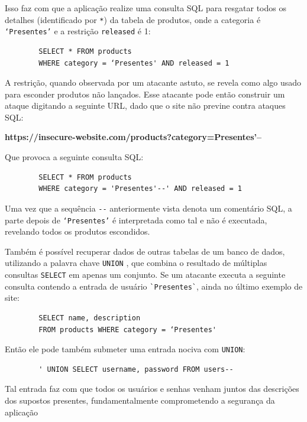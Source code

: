 \begin{alineas}
    Isso faz com que a aplicação realize uma consulta SQL para resgatar todos os detalhes (identificado por \verb+*+) da tabela de produtos, onde a categoria é \verb+‘Presentes’+ e a restrição \verb+released+ é 1:
    
    \begin{verbatim}
        SELECT * FROM products
        WHERE category = ‘Presentes' AND released = 1 
    \end{verbatim}
    
    A restrição, quando observada por um atacante astuto, se revela como algo usado para esconder produtos não lançados. Esse atacante pode então construir um ataque digitando a seguinte URL, dado que o site não previne contra ataques SQL:
        
    \textbf{https://insecure-website.com/products?category=Presentes’--}
    
    Que provoca a seguinte consulta SQL:
    
    \begin{verbatim}
        SELECT * FROM products 
        WHERE category = 'Presentes'--' AND released = 1 
    \end{verbatim}
    
     Uma vez que a sequência \verb+--+ anteriormente vista denota um comentário SQL, a parte depois de 
    \verb+‘Presentes’+ é interpretada como tal e não é executada, revelando todos os produtos escondidos.

    \item
    Também é possível recuperar dados de outras tabelas de um banco de dados, utilizando a palavra chave \verb+UNION+ \cite{mysql_union}, que combina o resultado de múltiplas consultas \verb+SELECT+ em apenas um conjunto. Se um atacante executa a seguinte consulta contendo a entrada de usuário \verb+`Presentes`+, ainda no último exemplo de site:
    
    \begin{verbatim}
        SELECT name, description
        FROM products WHERE category = ‘Presentes'
    \end{verbatim}
    
    Então ele pode também submeter uma entrada nociva com \verb+UNION+:
    
    \begin{verbatim}
        ' UNION SELECT username, password FROM users--
    \end{verbatim}
        
    Tal entrada faz com que todos os usuários e senhas venham juntos das descrições dos supostos presentes, fundamentalmente comprometendo a segurança da aplicação

\end{alineas}


